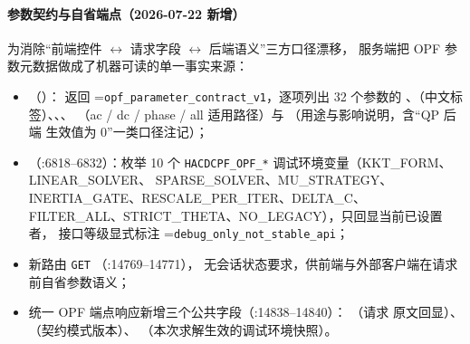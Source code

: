 \paragraph{参数契约与自省端点（2026-07-22 新增）}
为消除``前端控件 $\leftrightarrow$ 请求字段 $\leftrightarrow$ 后端语义''三方口径漂移，
服务端把 OPF 参数元数据做成了机器可读的单一事实来源：
\begin{itemize}
  \item {}（）：
        返回 =\texttt{opf\_parameter\_contract\_v1}，逐项列出 32 个参数的
        、（中文标签）、、、
        （ac / dc / phase / all 适用路径）与 
        （用途与影响说明，含``QP 后端  生效值为 0''一类口径注记）；
  \item {}（:6818--6832）：枚举 10 个
        \texttt{HACDCPF\_OPF\_*} 调试环境变量（KKT\_FORM、LINEAR\_SOLVER、
        SPARSE\_SOLVER、MU\_STRATEGY、INERTIA\_GATE、RESCALE\_PER\_ITER、DELTA\_C、
        FILTER\_ALL、STRICT\_THETA、NO\_LEGACY），只回显当前已设置者，
        接口等级显式标注 =\texttt{debug\_only\_not\_stable\_api}；
  \item 新路由 \texttt{GET} （:14769--14771），
        无会话状态要求，供前端与外部客户端在请求前自省参数语义；
  \item 统一 OPF 端点响应新增三个公共字段（:14838--14840）：
        （请求  原文回显）、
        （契约模式版本）、
        （本次求解生效的调试环境快照）。
\end{itemize}

